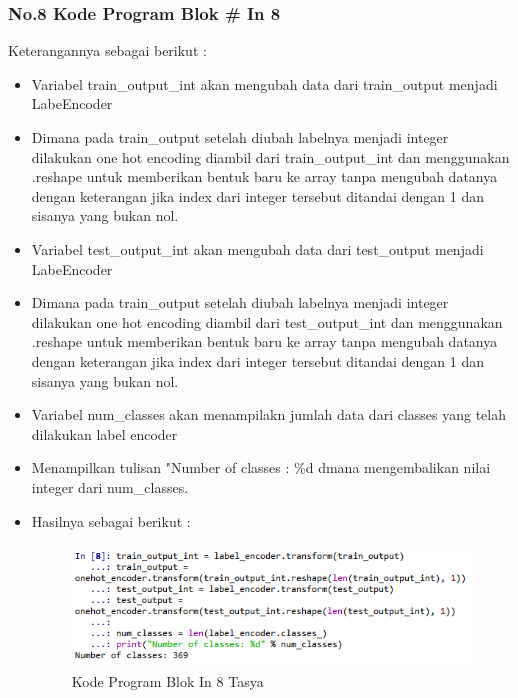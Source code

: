 \subsubsection{No.8 Kode Program Blok \# In 8}

Keterangannya sebagai berikut :\\
\begin{itemize}
\item Variabel train\_output\_int  akan mengubah data dari train\_output menjadi LabeEncoder
\item Dimana pada train\_output setelah diubah labelnya menjadi integer dilakukan one hot encoding diambil dari train\_output\_int dan menggunakan .reshape untuk memberikan bentuk baru ke array tanpa mengubah datanya dengan keterangan jika index dari integer tersebut ditandai dengan 1 dan sisanya yang bukan nol.
\item Variabel test\_output\_int  akan mengubah data dari test\_output menjadi LabeEncoder
\item Dimana pada train\_output setelah diubah labelnya menjadi integer dilakukan one hot encoding diambil dari test\_output\_int dan menggunakan .reshape untuk memberikan bentuk baru ke array tanpa mengubah datanya dengan keterangan jika index dari integer tersebut ditandai dengan 1 dan sisanya yang bukan nol.
\item Variabel num\_classes akan menampilakn jumlah data dari classes yang telah dilakukan label encoder
\item Menampilkan tulisan "Number of classes : \%d dmana mengembalikan nilai integer dari num\_classes.
\item Hasilnya sebagai berikut : \\
\begin{figure}[ht]
\centering
\includegraphics[scale=0.5]{figures/Chapter 7/1164086/Praktek/chapter7tasya21.png}
\caption{Kode Program Blok In 8 Tasya}
\label{Praktek}
\end{figure}
\end{itemize}

